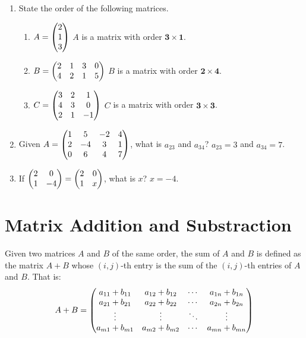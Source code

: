 \documentclass{report}
\begin{document}
\begin{multicols}{2}
  \begin{enumerate}
    \item State the order of the following matrices.

          \begin{enumerate}

            \item $A = \begin{pmatrix}
                      2 \\
                      1 \\
                      3
                    \end{pmatrix}$
                  \sol{}
                  $A$ is a matrix with order $\mathbf{3 \times 1}$.

            \item $B = \begin{pmatrix}
                      2 & 1 & 3 & 0 \\
                      4 & 2 & 1 & 5
                    \end{pmatrix}$
                  \sol{}
                  $B$ is a matrix with order $\mathbf{2 \times 4}$.

            \item $C = \begin{pmatrix}
                      3 & 2 & 1  \\
                      4 & 3 & 0  \\
                      2 & 1 & -1
                    \end{pmatrix}$
                  \sol{}
                  $C$ is a matrix with order $\mathbf{3 \times 3}$.

          \end{enumerate}

    \item Given $A = \begin{pmatrix} 1 & 5 & -2 & 4 \\ 2 & -4 & 3 & 1 \\ 0 & 6 & 4 & 7 \end{pmatrix}$, what is
          $a_{23}$ and $a_{34}$? \sol{} $a_{23} = 3$ and $a_{34} = 7$.

    \item If $\begin{pmatrix} 2 & 0 \\ 1 & -4 \end{pmatrix} = \begin{pmatrix} 2 & 0 \\ 1 & x \end{pmatrix}$, what is $x$? \sol{} $x =
            -4$.
  \end{enumerate}

  \section{Matrix Addition and Substraction}

  \doublespacing{}

  Given two matrices $A$ and $B$ of the same order, the sum of $A$ and $B$ is
  defined as the matrix $A + B$ whose $(i, j)$-th entry is the sum of the $(i,
    j)$-th entries of $A$ and $B$. That is: \[A + B = \begin{pmatrix}
      a_{11} + b_{11} & a_{12} + b_{12} & \cdots & a_{1n} + b_{1n} \\
      a_{21} + b_{21} & a_{22} + b_{22} & \cdots & a_{2n} + b_{2n} \\
      \vdots          & \vdots          & \ddots & \vdots          \\
      a_{m1} + b_{m1} & a_{m2} + b_{m2} & \cdots & a_{mn} + b_{mn}
    \end{pmatrix}\]


\end{multicols}
\end{document}
